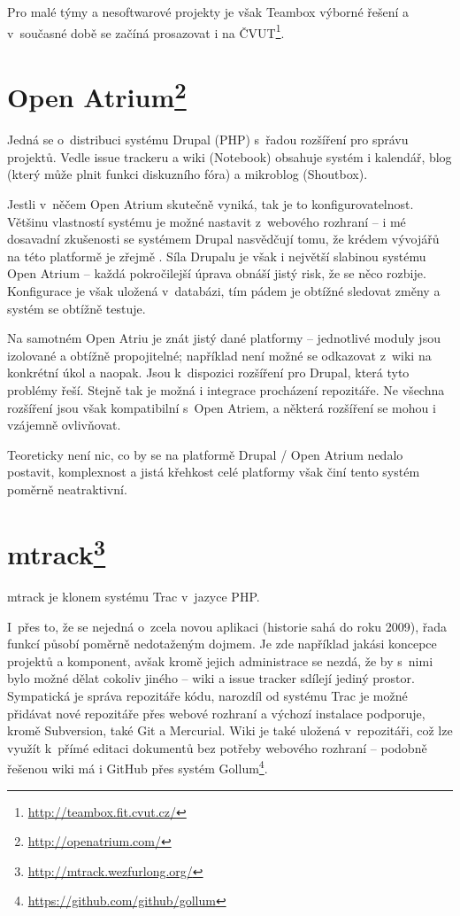 \documentclass[thesis=B,czech]{FITthesis}[2012/05/02]
\begin{document}
Pro malé týmy a nesoftwarové projekty je však Teambox výborné řešení a
v~současné době se začíná prosazovat i na ČVUT\footnote{\url{http://teambox.fit.cvut.cz/}}.

\section[Open Atrium]{Open Atrium\footnote{\url{http://openatrium.com/}}}

Jedná se o~distribuci systému Drupal (PHP) s~řadou rozšíření pro správu
projektů. Vedle issue trackeru a wiki (Notebook) obsahuje systém i
kalendář, blog (který může plnit funkci diskuzního fóra) a
\gls{mikroblog} (Shoutbox).

Jestli v~něčem Open Atrium skutečně vyniká, tak je to
konfigurovatelnost. Většinu vlastností systému je možné nastavit
z~webového rozhraní -- i mé dosavadní zkušenosti se systémem Drupal
nasvědčují tomu, že krédem vývojářů na této platformě je zřejmě
. Síla Drupalu je však i největší
slabinou systému Open Atrium -- každá pokročilejší úprava obnáší jistý
risk, že se něco rozbije. Konfigurace je však uložená v~databázi, tím
pádem je obtížné sledovat změny a systém se obtížně testuje.

Na samotném Open Atriu je znát jistý  dané platformy --
jednotlivé moduly jsou izolované a obtížně propojitelné; například není
možné se odkazovat z~wiki na konkrétní úkol a naopak. Jsou k~dispozici
rozšíření pro Drupal, která tyto problémy řeší. Stejně tak je možná i
integrace procházení repozitáře. Ne všechna rozšíření jsou však
kompatibilní s~Open Atriem, a některá rozšíření se mohou i vzájemně
ovlivňovat.

Teoreticky není nic, co by se na platformě Drupal / Open Atrium nedalo
postavit, komplexnost a jistá křehkost celé platformy však činí tento
systém poměrně neatraktivní.

\section[mtrack]{mtrack\footnote{\url{http://mtrack.wezfurlong.org/}}}

mtrack je klonem systému Trac v~jazyce PHP.

I~přes to, že se nejedná o~zcela novou aplikaci (historie sahá do roku
2009), řada funkcí působí poměrně nedotaženým dojmem. Je zde například
jakási koncepce projektů a komponent, avšak kromě jejich administrace se
nezdá, že by s~nimi bylo možné dělat cokoliv jiného -- wiki a issue
tracker sdílejí jediný prostor. Sympatická je správa repozitáře kódu,
narozdíl od systému Trac je možné přidávat nové repozitáře přes webové
rozhraní a výchozí instalace podporuje, kromě Subversion, také Git a
Mercurial. Wiki je také uložená v~repozitáři, což lze využít k~přímé
editaci dokumentů bez potřeby webového rozhraní -- podobně řešenou wiki
má i GitHub přes systém Gollum\footnote{\url{https://github.com/github/gollum}}.
\end{document}
